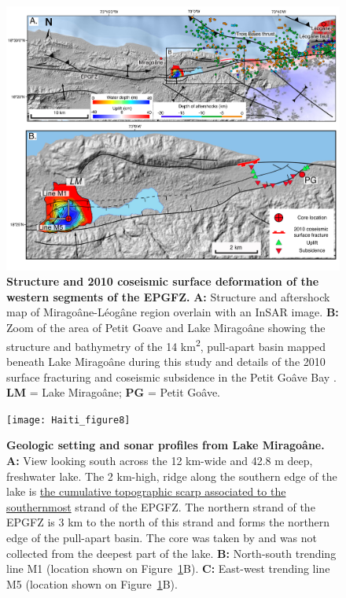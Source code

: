 \documentclass[linenumbers,draft]{agujournal}
\begin{document}
\begin{figure}
\centering
\includegraphics[width=\textwidth]{Haiti_figure7}
\caption{\textbf{Structure and 2010 coseismic surface deformation of the western segments of the EPGFZ.} \textbf{A:} Structure \citep{prentice2010seismic} and aftershock \citep{douilly2015three} map of Mirago\^ane-L\'eog\^ane region overlain with an InSAR image. \textbf{B:} Zoom of the area of Petit Goave and Lake Mirago\^ane showing the structure and bathymetry of the 14 km\textsuperscript{2}, pull-apart basin mapped beneath Lake Mirago\^ane during this study and details of the 2010 surface fracturing and coseismic subsidence in the Petit Go\^ave Bay \citep{prentice2010seismic}. \textbf{LM} = Lake Mirago\^ane; \textbf{PG} = Petit Go\^ave.}
\label{figure7}
\end{figure}

\begin{figure}
\centering
\texttt{[image: Haiti\_figure8]}
\caption{\textbf{Geologic setting and sonar profiles from Lake Mirago\^ane.} \textbf{A:} View looking south across the 12 km-wide and 42.8 m deep, freshwater lake. The 2 km-high, ridge along the southern edge of the lake is \ul{the cumulative topographic scarp associated to the southernmost} strand of the EPGFZ. The northern strand of the EPGFZ is 3 km to the north of this strand and forms the northern edge of the pull-apart basin. The core was taken by \citet{higuera199910} and was not collected from the deepest part of the lake. \textbf{B:} North-south trending line M1 (location shown on Figure~\ref{figure7}B). \textbf{C:} East-west trending line M5 (location shown on Figure~\ref{figure7}B).}
\label{figure8}
\end{figure}
\end{document}
